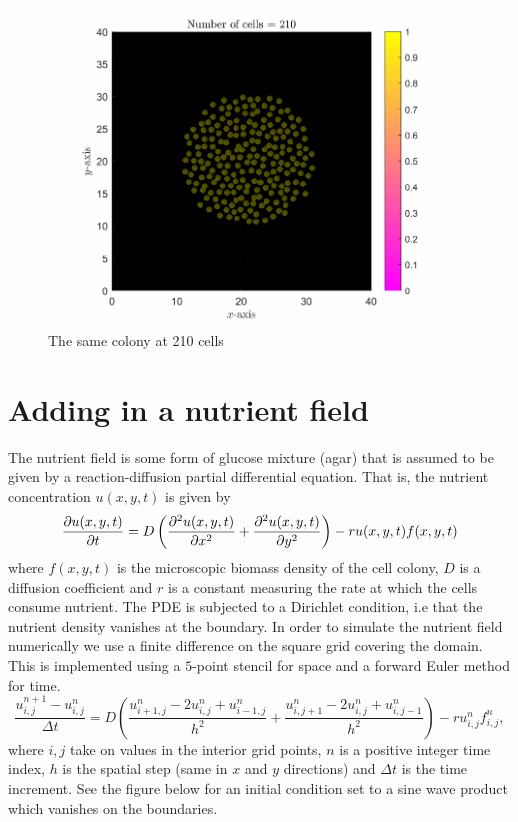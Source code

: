 \begin{figure}[h]
\centering
\includegraphics[width=1\textwidth]{chapter1/figures/ColonySimulationDemo_N_210.pdf}
\caption{The same colony at 210 cells}
\label{fig:ColonySimulationN210}
\end{figure}
\filbreak

\section{Adding in a nutrient field}
The nutrient field is some form of glucose mixture (agar) that is assumed to be given by a reaction-diffusion 
partial differential equation. That is, the nutrient concentration $u(x,y,t)$ is given by
\begin{equation}
    \pdv{u(x,y,t)}{t} = D \left( \frac{\partial^2 u(x,y,t)}{\partial x^2} + 
                          \frac{\partial^2 u(x,y,t)}{\partial y^2} \right) - r u(x,y,t) f(x,y,t)
\end{equation}
where $f(x,y,t)$ is the microscopic biomass density of the cell colony, $D$ is a diffusion
coefficient and $r$ is a constant measuring the rate at which the cells consume nutrient.
The PDE is subjected to a Dirichlet condition, i.e
that the nutrient density vanishes at the boundary. In order to simulate the nutrient field
numerically we use a finite difference on the square grid covering the domain. This is implemented 
using a $5$-point stencil for space and a forward Euler method for time.
\begin{equation}
    \frac{u_{i,j}^{n+1} - u_{i,j}^n}{\Delta t} = 
    D \left( \frac{u_{i+1,j}^{n} - 2 u_{i,j}^n +u_{i-1,j}^n}{h^2} +
             \frac{u_{i,j+1}^{n} - 2 u_{i,j}^n +u_{i,j-1}^n}{h^2} \right)-
             r u_{i,j}^n f_{i,j}^n,
\end{equation}
where $i,j$ take on values in the interior grid points, $n$ is a positive integer time index, 
$h$ is the spatial step (same in $x$ and $y$ directions) and $\Delta t$ is the time increment. See the
figure below for an initial condition set to a sine wave product which vanishes on the boundaries.


